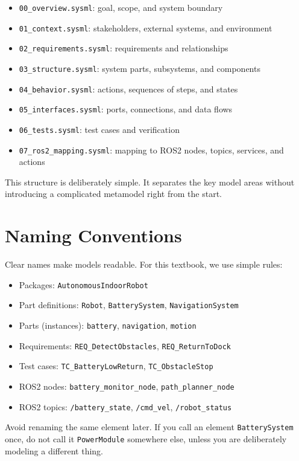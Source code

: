 \begin{itemize}
    \item \texttt{00\_overview.sysml}: goal, scope, and system boundary
    \item \texttt{01\_context.sysml}: stakeholders, external systems, and environment
    \item \texttt{02\_requirements.sysml}: requirements and relationships
    \item \texttt{03\_structure.sysml}: system parts, subsystems, and components
    \item \texttt{04\_behavior.sysml}: actions, sequences of steps, and states
    \item \texttt{05\_interfaces.sysml}: ports, connections, and data flows
    \item \texttt{06\_tests.sysml}: test cases and verification
    \item \texttt{07\_ros2\_mapping.sysml}: mapping to ROS2 nodes, topics, services, and actions
\end{itemize}

This structure is deliberately simple. It separates the key model areas without introducing a complicated metamodel right from the start.

\section{Naming Conventions}
Clear names make models readable. For this textbook, we use simple rules:

\begin{itemize}
    \item Packages: \texttt{AutonomousIndoorRobot}
    \item Part definitions: \texttt{Robot}, \texttt{BatterySystem}, \texttt{NavigationSystem}
    \item Parts (instances): \texttt{battery}, \texttt{navigation}, \texttt{motion}
    \item Requirements: \texttt{REQ\_DetectObstacles}, \texttt{REQ\_ReturnToDock}
    \item Test cases: \texttt{TC\_BatteryLowReturn}, \texttt{TC\_ObstacleStop}
    \item ROS2 nodes: \texttt{battery\_monitor\_node}, \texttt{path\_planner\_node}
    \item ROS2 topics: \texttt{/battery\_state}, \texttt{/cmd\_vel}, \texttt{/robot\_status}
\end{itemize}

Avoid renaming the same element later. If you call an element \texttt{BatterySystem} once, do not call it \texttt{PowerModule} somewhere else, unless you are deliberately modeling a different thing.

